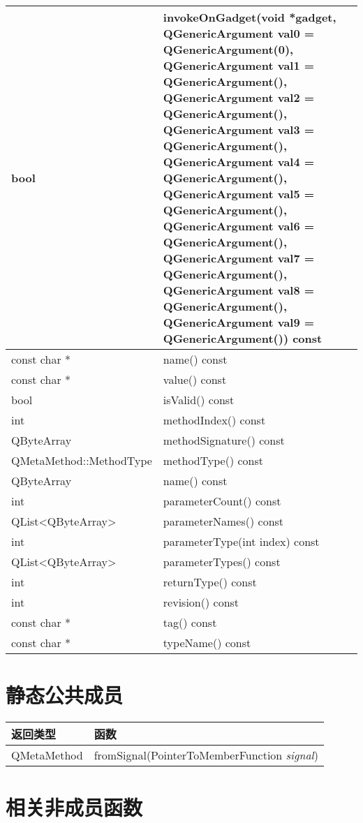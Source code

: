 \begin{longtable}{|l|m{27em}|}
\hline
bool &	invokeOnGadget(void *gadget, QGenericArgument val0 = QGenericArgument(0), QGenericArgument val1 = QGenericArgument(), QGenericArgument val2 = QGenericArgument(), QGenericArgument val3 = QGenericArgument(), QGenericArgument val4 = QGenericArgument(), QGenericArgument val5 = QGenericArgument(), QGenericArgument val6 = QGenericArgument(), QGenericArgument val7 = QGenericArgument(), QGenericArgument val8 = QGenericArgument(), QGenericArgument val9 = QGenericArgument()) const \\
\hline
const char * 	&name() const \\
\hline
const char * 	& value() const \\ 
\hline
bool & 	isValid() const \\ 
\hline
int	& methodIndex() const \\ 
\hline
QByteArray &	methodSignature() const \\ 
\hline
QMetaMethod::MethodType	 & methodType() const \\
\hline
QByteArray & 	name() const \\ 
\hline
int	& parameterCount() const \\
\hline
QList<QByteArray>	& parameterNames() const \\
\hline
int	& parameterType(int index) const \\
\hline
QList<QByteArray> &	parameterTypes() const \\
\hline
int	& returnType() const \\
\hline
int	& revision() const \\ 
\hline
const char *	& tag() const \\ 
\hline
const char *	& typeName() const \\ 
\hline
\end{longtable}


\section{静态公共成员}


\begin{tabular}{|l|l|}
\hline
返回类型 &	函数 \\ 
\hline
QMetaMethod 	&fromSignal(PointerToMemberFunction \emph{signal}) \\ 
\hline
\end{tabular}

\section{相关非成员函数}

